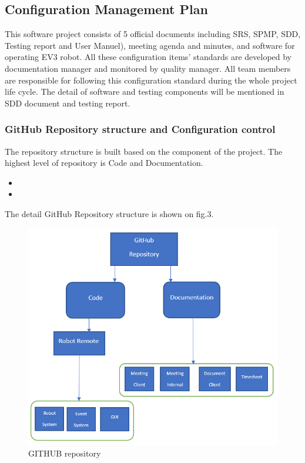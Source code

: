 \subsection{Configuration Management Plan}
This software project consists of 5 official documents including SRS, SPMP, SDD, Testing report and User Manuel), meeting agenda and minutes, and software for operating EV3 robot. All these configuration items’ standards are developed by documentation manager and monitored by quality manager. All team members are responsible for following this configuration standard during the whole project life cycle. The detail of software and testing components will be mentioned in SDD document and testing report.

\subsubsection{GitHub Repository structure and Configuration control}
The repository structure is built based on the component of the project. The highest level of repository is Code and Documentation. 
\begin{itemize}
	\item \texttt{}
	\item \texttt{}
\end{itemize}
The detail GitHub Repository structure is shown on fig.3.

\begin{figure}[H]
	\includegraphics[width=\linewidth]{GIT.PNG}  %
	\caption{GITHUB repository}
	\label{fig:GITHUB repository}				
\end{figure}

